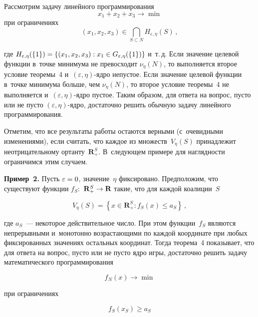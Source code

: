 \begin{multicols}{2}
\vspace*{-2pt}

\noindent
Рассмотрим задачу линейного программирования 
$$
x_1+x_2+x_3\to \min
$$
при ограничениях
$$
(x_1, x_2, x_3) \in\mathop{\bigcap}\limits_{S\subset N} H_{\varepsilon,\eta} (S)\,,
$$

\vspace*{-2pt}

\noindent
где $H_{\varepsilon,\eta}(\{1\}) \hm= \{ (x_1,x_2,x_3): x_1\hm\in 
G_{\varepsilon,\eta}(\{1\})\}$ и~т.\,д. Если значение целевой функции в~точке 
минимума не превосходит $\nu_\eta(N)$, то выполняется второе условие 
теоремы~4 и~$(\varepsilon,\eta)$-яд\-ро непустое. Если значение целевой 
функции в~точке минимума больше, чем $\nu_\eta(N)$, то второе условие 
теоремы~4 не выполняется и~$(\varepsilon,\eta)$-яд\-ро пустое. Таким образом, 
для ответа на вопрос, пусто или не пусто $(\varepsilon,\eta)$-яд\-ро, достаточно 
решить обычную задачу линейного программирования. 
    
Отметим, что все результаты работы остаются верными (с~очевидными 
изменениями), если считать, что каждое из множеств~$V_\eta(S)$ принадлежит 
неотрицательному ортанту~$\mathbf{R}_+^S$. В~следующем примере для 
наглядности ограничимся этим случаем.

\columnbreak
    
\textbf{Пример~2.} Пусть $\varepsilon\hm=0$, значение~$\eta$ фиксировано. 
Предположим, что существуют функции $f_S:$ $\mathbf{R}_+^S\hm\to 
\mathbf{R}$ такие, что для каждой коалиции~$S$ 

\noindent
$$
V_\eta(S)= \left\{ x\in \mathbf{R}_+^S: f_S(x)\leq a_S\right\}\,,
$$

\vspace*{-2pt}

\noindent
где $a_S$~--- некоторое действительное число. При этом функции~$f_S$ 
являются непрерывными и~монотонно возрастающими по каждой координате 
при любых фиксированных значениях остальных координат. Тогда теорема~4 
показывает, что для ответа на вопрос, пусто или не пусто ядро игры, 
достаточно решить задачу математического программирования

\vspace*{2pt}

\noindent
$$
f_N(x)\to \min
$$

\vspace*{-2pt}

\noindent
при ограничениях

\noindent
$$
f_S(x_S)\geq a_S
$$


\end{multicols}
